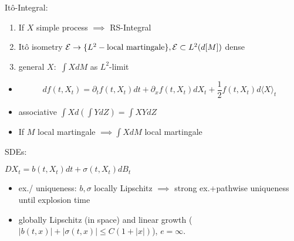 Itô-Integral:

\begin{enumerate}
    \item If $X$ simple process $\implies$ RS-Integral
    \item Itô isometry $\mathcal{E}\to\{L^2-\text{local martingale}\},\mathcal{E}\subset L^2(d[M])$ dense
    \item general $X:$ $\int XdM$ as $L^2$-limit
\end{enumerate}
\begin{aremark}
    \begin{itemize}
        \item \[df(t,X_t)=\partial_t f(t,X_t)dt+\partial_xf(t,X_t)dX_t+\frac{1}{2}f(t,X_t)d\langle X\rangle_t\]
        \item associative $\int Xd(\int Y dZ)=\int XYdZ$
        \item If $M$ local martingale $\implies \int XdM$ local martingale
    \end{itemize}
\end{aremark}

SDEs:

$DX_t=b(t,X_t)dt+\sigma(t,X_t)dB_t$

\begin{itemize}
    \item ex./ uniqueness: $b,\sigma$ locally Lipschitz $\implies$ strong ex.+pathwise uniqueness until explosion time
    \item globally Lipschitz (in space) and linear growth ($|b(t,x)|+|\sigma(t,x)|\leq C(1+|x|)$), $e=\infty$.
\end{itemize}



